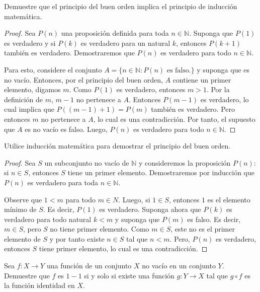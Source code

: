 \documentclass[12pt]{article}
\newcommand{\N}{\mathbb{N}}
\newenvironment{problem}[2][Problema]{\begin{trivlist}
\item[\hskip \labelsep {\bfseries #1}\hskip \labelsep {\bfseries #2.}]}{\end{trivlist}}
\begin{document}
\begin{problem}{4} Demuestre que el principio del buen orden  implica el  principio de inducción matemática.
\end{problem}

\begin{proof}
Sea $P(n)$ una proposición definida para toda $n\in \N$. Suponga que $P(1)$ es verdadero y si $P(k)$ es verdadero para un natural $k$, entonces $P(k + 1)$ también es verdadero. Demostraremos que $P(n)$ es verdadero para todo $n \in \N$. 

Para esto, considere el conjunto $A = \{n \in \N: P(n) \text{ es falso.} \}$ y suponga que es no vacío. Entonces, por el principio del buen orden, $A$ contiene un primer elemento, digamos $m$. Como $P(1)$ es verdadero, entonces $m > 1$. Por la definición de $m$, $m - 1$ no pertenece a $A$. Entonces $P(m - 1)$ es verdadero, lo cual implica que $P((m - 1) + 1) = P(m)$ también es verdadero. Pero entonces $m$ no pertenece a $A$, lo cual es una contradicción. 
Por tanto, el supuesto que $A$ es no vacío es falso. Luego, $P(n)$ es verdadero para todo $n\in \N$. 
\end{proof}

\text{ }

\begin{problem}{5} Utilice inducción matemática para demostrar el principio del buen orden. 

\end{problem}
\begin{proof}
Sea $S$ un subconjunto no vacío de $\N$ y consideremos la proposición $P(n)$: si $n \in S$, entonces $S$ tiene un primer elemento. Demostraremos por inducción que $P(n)$ es verdadero para toda $n \in \N$. 

Observe que $1 < m$ para todo $m \in N$. Luego, si $1 \in S$, entonces $1$ es el elemento mínimo de $S$. Es decir, $P(1)$ es verdadero.
Suponga ahora que $P(k)$ es verdadero para todo natural $k < m$ y suponga que $P(m)$ es falso. Es decir, $m \in S$,  pero $S$ no tiene primer elemento. Como $m \in S$, este no es el primer elemento de $S$ y por tanto existe $n \in S$ tal que $n < m$. Pero, $P(n)$ es verdadero, entonces $S$ tiene primer elemento, lo cual es una contradicción. 

\end{proof}
\text{ }
\begin{problem}{6}
Sea $f: X \rightarrow Y$ una función de un conjunto $X$ no vacío en un conjunto $Y$. Demuestre que $f$ es $1-1$ si y solo si existe una función $g: Y \rightarrow X$ tal que $g \circ f$ es la función identidad en $X$. 
\end{problem}
\end{document}
